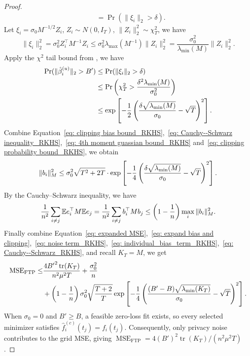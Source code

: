 \begin{proof}
\begin{align*}
&=\operatorname{Pr}(\|\xi_i\|_2>\delta).
\end{align*}
Let $\xi_i = \sigma_0 M^{-1/2}Z_i$, $Z_i\sim N(0, I_T)$, $\|Z_i\|_2^2\sim \chi^2_T$, we have
\[
\|\xi_i\|_2^2
= 
\sigma_0^2 Z_i^\top M^{-1} Z_i 
\le 
\sigma_0^2 \lambda_{\max}(M^{-1}) \|Z_i\|_2^2
=
\dfrac{\sigma_0^2}{\lambda_{\min}(M)} \|Z_i\|_2^2.
\]
Apply the $\chi^2$ tail bound from \citet{laurent2000adaptive}, we have
\begin{align}
\operatorname{Pr}(\|\hat{\beta}_i^{(u)}\|_2>B')
&\le
\operatorname{Pr}(\|\xi_i\|_2>\delta)
\nonumber\\
&\le
\operatorname{Pr}
\Bra{
\chi^2_T > \dfrac{\delta^2 \lambda_{\min}(M)}{\sigma_0^2}
}
\nonumber\\
&\le
\exp\SqBra{
-\dfrac{1}{2}\Bra{
\dfrac{\delta\sqrt{\lambda_{\min}(M)}}{\sigma_0}
- \sqrt{T}
}^2
}.
\label{eq: clipping probability bound_RKHS}
\end{align}
Combine Equation~\eqref{eq: clipping bias bound_RKHS},~\eqref{eq: Cauchy--Schwarz inequality_RKHS},~\eqref{eq: 4th moment guassian bound_RKHS} and~\eqref{eq: clipping probability bound_RKHS}, we obtain
\begin{equation}
    \|b_i\|_M^2
    \leq
    \sigma_0^2\sqrt{T^2+2T}\cdot
    \exp\SqBra{
    -\dfrac{1}{4}\Bra{
    \dfrac{\delta\sqrt{\lambda_{\min}(M)}}{\sigma_0}
    - \sqrt{T}
    }^2
    }.
    \label{eq: individual_bias_term_RKHS}
\end{equation}
By the Cauchy--Schwarz inequality, we have
\begin{equation}
\dfrac{1}{n^2} \sum_{i\ne j} \mathbb E e_i^\top M \mathbb E e_j
=
\dfrac{1}{n^2} \sum_{i\ne j} b_i^\top M b_j
\le
\Bra{1-\dfrac{1}{n}} \max_{i} \|b_i\|^2_M.
\label{eq: Cauchy--Schwarz_RKHS}
\end{equation}
Finally combine Equation~\eqref{eq: expanded MSE},~\eqref{eq: expand bias and clipping},~\eqref{eq: noise term_RKHS},~\eqref{eq: individual_bias_term_RKHS},~\eqref{eq: Cauchy--Schwarz_RKHS}, and recall $K_T=M$, we get
\begin{equation}
\begin{aligned}
\mathrm{MSE}_{\mathrm{FTP}}
\leq
&\frac{4{B'}^2\operatorname{tr}(K_T)}{n^2\mu^2T}
+
\dfrac{\sigma_0^2}{n}\\
&+
\Bra{1-\dfrac{1}{n}}
\sigma_0^2 \sqrt{\dfrac{T+2}{T}}
\exp\SqBra{
-\dfrac{1}{4}\Bra{
\dfrac{(B'-B)\sqrt{\lambda_{\min}(K_T)}}{\sigma_0}
- \sqrt{T}
}^2
}.
\end{aligned}
\label{eq: final_MSE_FTP bound}
\end{equation}
When $\sigma_0=0$ and $B'\ge B$, a feasible zero-loss fit exists, so every selected minimizer satisfies $\hat f_i^{(c)}(t_j)=f_i(t_j)$. Consequently, only privacy noise contributes to the grid MSE, giving $\operatorname{MSE}_{\mathrm{FTP}}=4(B')^2\operatorname{tr}(K_T)/(n^2\mu^2T)$.
\end{proof}
